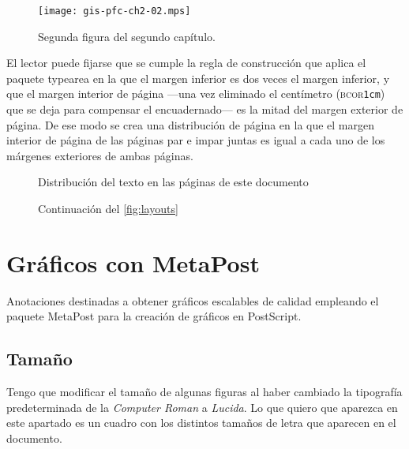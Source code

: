 \begin{figure}
	\begin{center}
		\texttt{[image: gis-pfc-ch2-02.mps]}
	\end{center}
	\caption[Segunda figura del segundo capítulo]{Segunda figura del
	segundo capítulo.}
	\label{fig:ch102}
\end{figure}

El lector puede fijarse que se cumple la regla de construcción que aplica
el paquete \textsf{typearea} en la que el margen inferior es dos veces el
margen inferior, y que el margen interior de página ---una vez eliminado el
centímetro (\textsc{bcor}\texttt{1cm}) que se deja para compensar el
encuadernado--- es la mitad del margen exterior de página. De ese modo se
crea una distribución de página en la que el margen interior de página de
las páginas par e impar juntas es igual a cada uno de los márgenes
exteriores de ambas páginas.

\begin{figure}
	\pagediagram
	\caption{Distribución del texto en las páginas de este documento}
	\label{fig:layouts}
\end{figure}

\begin{figure}\ContinuedFloat
	\currentpage
	\pagedesign
	\caption[]{Continuación del \vref{fig:layouts}}
\end{figure}


\section{Gráficos con MetaPost}

Anotaciones destinadas a obtener gráficos escalables de calidad empleando
el paquete MetaPost para la creación de gráficos en PostScript.


\subsection{Tamaño}

Tengo que modificar el tamaño de algunas figuras al haber cambiado la
tipografía predeterminada de la \emph{Computer Roman} a \emph{Lucida}. Lo
que quiero que aparezca en este apartado es un cuadro con los distintos
tamaños de letra que aparecen en el documento.
